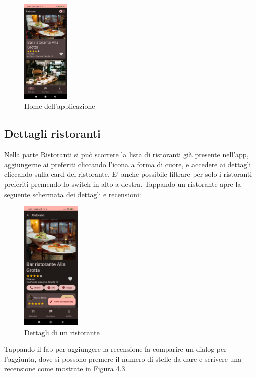 \documentclass[12pt, a4paper]{report}
\begin{document}
	\begin{figure}[h]
		\centering
		\includegraphics[width=0.2\textwidth]{screenHome.jpg} 
	  \caption{Home dell'applicazione}
		
	\end{figure}


	\subsection{Dettagli ristoranti}
	Nella parte Ristoranti si può scorrere la lista di ristoranti già presente nell'app, aggiungerne ai preferiti cliccando l'icona a forma di cuore, e accedere ai dettagli cliccando sulla card del ristorante. E' anche possibile filtrare per solo i ristoranti preferiti premendo lo switch in alto a destra.
	Tappando un ristorante apre la seguente schermata dei dettagli e recensioni:



	\begin{figure}[h]
		\centering
		\includegraphics[width=0.25\textwidth]{screenDetails.jpg} 
	  \caption{Dettagli di un ristorante}
		
	\end{figure}


	Tappando il fab per aggiungere la recensione fa comparire un dialog per l'aggiunta, dove si possono premere il numero di stelle da dare e scrivere una recensione come mostrate in Figura 4.3
	\pagebreak
\end{document}
